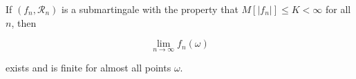If $(f_n, \mathcal{R}_n)$ is a submartingale with the property that $M[|f_n|] \leq K < \infty$ for all $n$, then

$$\lim_{n \to \infty} f_n(\omega)$$

exists and is finite for almost all points $\omega$.
